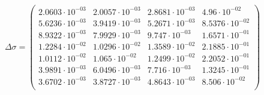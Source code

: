 \documentclass[]{article}
\begin{document}
\begin{equation}
\Delta\sigma=
\begin{pmatrix}
   2.0603\cdot 10^{-03} & 2.0057\cdot 10^{-03} & 2.8681\cdot 10^{-03} & 4.96\cdot 10^{-02} \\
   5.6236\cdot 10^{-03} & 3.9419\cdot 10^{-03} & 5.2671\cdot 10^{-03} & 8.5376\cdot 10^{-02} \\
   8.9322\cdot 10^{-03} & 7.9929\cdot 10^{-03} & 9.747\cdot 10^{-03} & 1.6571\cdot 10^{-01} \\
   1.2284\cdot 10^{-02} & 1.0296\cdot 10^{-02} & 1.3589\cdot 10^{-02} & 2.1885\cdot 10^{-01} \\
   1.0112\cdot 10^{-02} & 1.065\cdot 10^{-02} & 1.2499\cdot 10^{-02} & 2.2052\cdot 10^{-01} \\
   3.9891\cdot 10^{-03} & 6.0496\cdot 10^{-03} & 7.716\cdot 10^{-03} & 1.3245\cdot 10^{-01} \\
   3.6702\cdot 10^{-03} & 3.8727\cdot 10^{-03} & 4.8643\cdot 10^{-03} & 8.506\cdot 10^{-02} \\
\end{pmatrix}
\end{equation}
\end{document}
